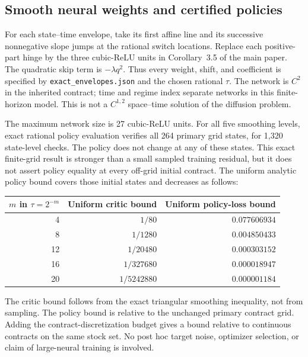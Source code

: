 \subsection{Smooth neural weights and certified policies}
For each state--time envelope, take its first affine line and its successive nonnegative slope jumps at the rational switch locations. Replace each positive-part hinge by the three cubic-ReLU units in Corollary~3.5 of the main paper. The quadratic skip term is $-\lambda q^2$. Thus every weight, shift, and coefficient is specified by \texttt{exact\_envelopes.json} and the chosen rational $\tau$. The network is $C^2$ in the inherited contract; time and regime index separate networks in this finite-horizon model. This is not a $C^{1,2}$ space--time solution of the diffusion problem.

The maximum network size is 27 cubic-ReLU units. For all five smoothing levels, exact rational policy evaluation verifies all 264 primary grid states, for 1,320 state-level checks. The policy does not change at any of these states. This exact finite-grid result is stronger than a small sampled training residual, but it does not assert policy equality at every off-grid initial contract. The uniform analytic policy bound covers those initial states and decreases as follows:
\begin{center}
\begin{tabular}{rrr}
\toprule
$m$ in $\tau=2^{-m}$ & Uniform critic bound & Uniform policy-loss bound\\
\midrule
4 & $1/80$ & $0.077606934$\\
8 & $1/1280$ & $0.004850433$\\
12 & $1/20480$ & $0.000303152$\\
16 & $1/327680$ & $0.000018947$\\
20 & $1/5242880$ & $0.000001184$\\
\bottomrule
\end{tabular}
\end{center}
The critic bound follows from the exact triangular smoothing inequality, not from sampling. The policy bound is relative to the unchanged primary contract grid. Adding the contract-discretization budget gives a bound relative to continuous contracts on the same stock set. No post hoc target noise, optimizer selection, or claim of large-neural training is involved.


